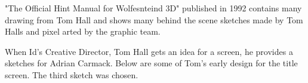 \documentclass[book.tex]{subfiles}
\begin{document}
\begin{minipage}{0.7\textwidth}
 "The Official Hint Manual for Wolfesnteind 3D" published in 1992 contains many drawing from Tom Hall and shows many behind the scene sketches made by Tom Halls and pixel arted by the graphic team.\\
\par
 \begin{fancyquotes}
When Id's Creative Director, Tom Hall gets an idea for a screen, he provides a sketches for Adrian Carmack. Below are some of Tom's early design for the title screen. The third sketch was chosen.\\
\end{fancyquotes}
\end{minipage}
\begin{minipage}{0.3\textwidth}
\begin{flushright}
\end{flushright}
\end{minipage}

\noindent
   \begin{figure}[H]
\centering
 \end{figure}
 \par
   \begin{figure}[H]
\centering
\end{figure} 



\begin{figure}[H]
\centering    
   \end{figure}

     \begin{figure}[H]
\centering
   \end{figure}
 
  \begin{figure}[H]
\centering
 \\
 \end{figure}








      \begin{minipage}{.48\textwidth}
  \end{minipage}
      \begin{minipage}{.48\textwidth}
  \end{minipage}
\end{document}
